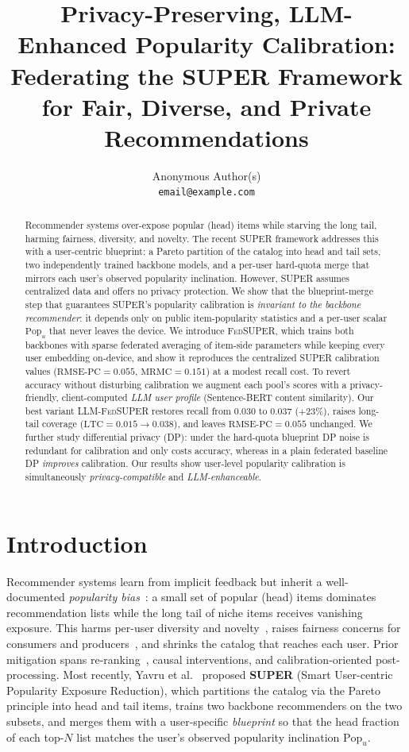 \documentclass{article}
\title{\textbf{Privacy-Preserving, LLM-Enhanced Popularity Calibration:\\ Federating the SUPER Framework for Fair, Diverse, and Private Recommendations}}
\author{Anonymous Author(s)\\\texttt{email@example.com}}
\newcommand{\Fed}{\textsc{FedSUPER}}
\newcommand{\LLMSuper}{\textsc{LLM-FedSUPER}}
\newcommand{\Pop}{\mathrm{Pop}}
\newcommand{\RMSEPC}{\mathrm{RMSE\text{-}PC}}
\newcommand{\MRMC}{\mathrm{MRMC}}
\newcommand{\LTC}{\mathrm{LTC}}
\begin{document}
\maketitle

\begin{abstract}
Recommender systems over-expose popular (head) items while starving the long tail, harming fairness, diversity, and novelty. The recent SUPER framework addresses this with a user-centric blueprint: a Pareto partition of the catalog into head and tail sets, two independently trained backbone models, and a per-user hard-quota merge that mirrors each user's observed popularity inclination. However, SUPER assumes centralized data and offers no privacy protection. We show that the blueprint-merge step that guarantees SUPER's popularity calibration is \emph{invariant to the backbone recommender}: it depends only on public item-popularity statistics and a per-user scalar \(\Pop_u\) that never leaves the device. We introduce \Fed{}, which trains both backbones with sparse federated averaging of item-side parameters while keeping every user embedding on-device, and show it reproduces the centralized SUPER calibration values (\(\RMSEPC{}=0.055\), \(\MRMC{}=0.151\)) at a modest recall cost. To revert accuracy without disturbing calibration we augment each pool's scores with a privacy-friendly, client-computed \emph{LLM user profile} (Sentence-BERT content similarity). Our best variant \LLMSuper{} restores recall from \(0.030\) to \(0.037\) (\(+23\%\)), raises long-tail coverage (\(\LTC{}=0.015\to0.038\)), and leaves \(\RMSEPC{}=0.055\) unchanged. We further study differential privacy (DP): under the hard-quota blueprint DP noise is redundant for calibration and only costs accuracy, whereas in a plain federated baseline DP \emph{improves} calibration. Our results show user-level popularity calibration is simultaneously \emph{privacy-compatible} and \emph{LLM-enhanceable}.
\end{abstract}

\section{Introduction}
\label{sec:intro}

Recommender systems learn from implicit feedback but inherit a well-documented
\emph{popularity bias}~\cite{abdollahpouri2019unfairness}: a small set of popular (head) items
dominates recommendation lists while the long tail of niche items receives vanishing exposure.
This harms per-user diversity and novelty~\cite{santos2010xquad}, raises fairness concerns for
consumers and producers~\cite{abdollahpouri2020multistakeholder}, and shrinks the catalog that
reaches each user. Prior mitigation spans re-ranking~\cite{abdollahpouri2019managing}, causal
interventions, and calibration-oriented post-processing. Most recently, Yavru et
al.~\cite{yavru2026super} proposed \textbf{SUPER} (Smart User-centric Popularity Exposure
Reduction), which partitions the catalog via the Pareto principle into head and tail items,
trains two backbone recommenders on the two subsets, and merges them with a user-specific
\emph{blueprint} so that the head fraction of each top-\(N\) list matches the user's observed
popularity inclination \(\Pop_u\).
\end{document}
